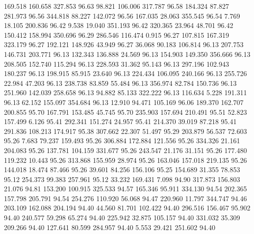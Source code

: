  169.518  160.658  327.853        96.63
  98.821  106.006  317.787        96.58
 184.324   87.827  281.973        96.56
 344.818   88.227  142.072        96.56
 167.035   28.063  355.545        96.54
   7.769   18.105  200.836        96.42
   9.538   19.040  351.193        96.42
 320.365   23.964   48.701        96.42
 150.412  158.994  350.696        96.29
 286.546  116.474    0.915        96.27
 107.815  167.319  323.179        96.27
 192.121  148.926   43.949        96.27
  36.068   90.183  106.814        96.13
 207.753  146.731  203.771        96.13
 132.343  136.888   24.569        96.13
 154.903  149.350  356.666        96.13
 208.505  152.740  115.294        96.13
 228.593   31.362   95.143        96.13
 297.196  102.943  180.237        96.13
 198.915   85.915   23.640        96.13
 224.434  106.095  240.166        96.13
 255.726   22.984   47.203        96.13
 238.738   83.859   55.484        96.13
 356.974   82.784  150.736        96.13
 251.960  142.039  258.658        96.13
  94.882   85.133  322.222        96.13
 116.634    5.228  191.311        96.13
  62.152  155.097  354.684        96.13
  12.910   94.471  105.169        96.06
 189.370  162.707  200.855        95.70
 167.791  153.485   45.745        95.70
 235.903  157.694  210.491        95.51
  52.823  157.499    6.126        95.41
 292.341  151.274   24.957        95.41
 214.370   39.019   87.218        95.41
 291.836  108.213  174.917        95.38
 307.662   22.307   51.497        95.29
 203.879   56.537   72.603        95.26
   7.683   79.237  159.493        95.26
 306.884  172.884  121.556        95.26
 334.326   21.161  204.083        95.26
 137.781  104.159  331.677        95.26
 243.547   21.176   31.151        95.26
 177.480  119.232   10.443        95.26
 313.868  155.959   28.974        95.26
 163.046  157.018  219.135        95.26
 144.018   18.474   87.466        95.26
  39.601   84.256  156.106        95.25
 154.689   31.355   78.853        95.12
 254.373   99.383  257.961        95.12
  33.232  169.431    7.098        94.90
 317.873  156.803   21.076        94.81
 153.200  100.915  325.533        94.57
 165.346   95.911  334.130        94.54
 202.365  157.798  205.791        94.54
 254.276  110.920   56.068        94.47
 220.960   11.797  344.747        94.46
 203.109  162.088  204.194        94.40
  44.560   81.701  102.422        94.40
 296.516  156.467   95.902        94.40
 240.577   59.298   65.274        94.40
 225.942   32.875  105.157        94.40
 331.032   35.309  209.266        94.40
 127.641   80.599  284.957        94.40
   5.553   29.421  251.602        94.40
